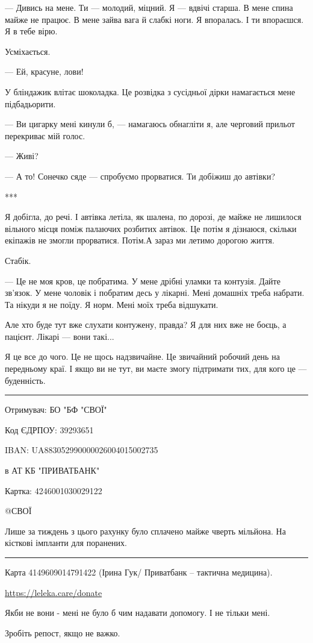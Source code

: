 — Дивись на мене. Ти — молодий, міцний. Я — вдвічі старша. В мене спина майже
не працює. В мене зайва вага й слабкі ноги. Я впоралась. І ти впораєшся. Я в
тебе вірю. 

Усміхається. 

 — Ей, красуне, лови! 

У бліндажик влітає шоколадка. Це розвідка з сусідньої дірки намагається мене
підбадьорити. 

— Ви цигарку мені кинули б, — намагаюсь обнагліти я, але черговий прильот
перекриває  мій голос. 

— Живі?

— А то! Сонечко сяде — спробуємо прорватися. Ти добіжиш до автівки? 

***

Я добігла, до речі.  І автівка летіла, як шалена, по дорозі, де майже не
лишилося вільного місця поміж палаючих розбитих автівок. Це потім я дізнаюся,
скільки екіпажів не змогли прорватися. Потім.А зараз ми летимо дорогою життя. 

Стабік. 

— Це не моя кров, це побратима. У мене дрібні уламки та контузія. Дайте
зв'язок. У мене чоловік і побратим  десь у лікарні. Мені домашніх треба
набрати. Та нікуди я не поїду. Я норм. Мені моїх треба відшукати. 

Але хто буде тут вже слухати контужену, правда? Я для них   вже не боєць, а
пацієнт. Лікарі — вони такі... 

Я це все до чого. Це не щось надзвичайне. Це звичайний робочий день на
передньому краї. І якщо ви не тут, ви маєте змогу підтримати тих, для кого це —
буденність.

\par\noindent\rule{\textwidth}{0.4pt}

Отримувач: БО "БФ "СВОЇ"\par
Код ЄДРПОУ: 39293651\par
IBAN: UA883052990000026004015002735\par
в АТ КБ "ПРИВАТБАНК"\par
Картка: 4246001030029122\par
@СВОЇ\par

Лише за тиждень з цього рахунку було сплачено майже чверть мільйона. На
кісткові імпланти для поранених. 

\par\noindent\rule{\textwidth}{0.4pt}

Карта 4149609014791422 (Ірина Гук/ Приватбанк – тактична медицина).

\url{https://leleka.care/donate}

Якби не вони - мені не було б чим надавати допомогу. І не тільки мені.

Зробіть репост, якщо не важко.
